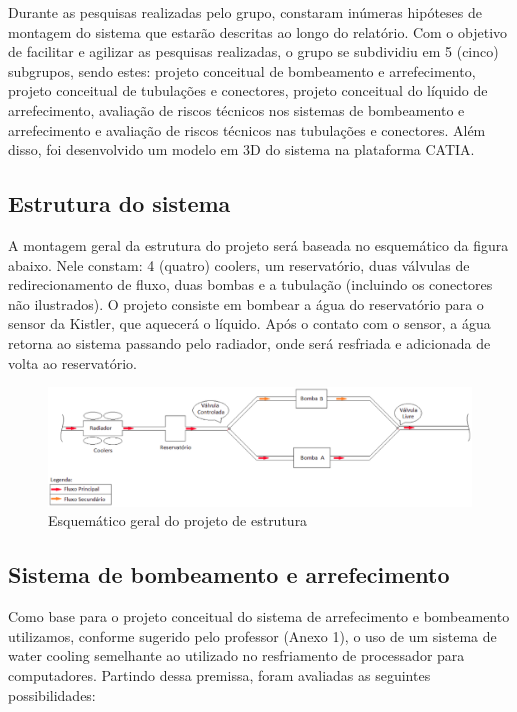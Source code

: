 Durante as pesquisas realizadas pelo grupo, constaram inúmeras hipóteses de montagem do sistema que estarão descritas ao longo do relatório. Com o objetivo de facilitar e agilizar as pesquisas realizadas, o grupo se subdividiu em 5 (cinco) subgrupos, sendo estes: projeto conceitual de bombeamento e arrefecimento, projeto conceitual de tubulações e conectores, projeto conceitual do líquido de arrefecimento, avaliação de riscos técnicos nos sistemas de bombeamento e arrefecimento e avaliação de riscos técnicos nas tubulações e conectores. Além disso, foi desenvolvido um modelo em 3D do sistema na plataforma CATIA.

\subsection{Estrutura do sistema}

A montagem geral da estrutura do projeto será baseada no esquemático da figura abaixo. Nele constam: 4 (quatro) coolers, um reservatório, duas válvulas de redirecionamento de fluxo, duas bombas e a tubulação (incluindo os conectores não ilustrados). O projeto consiste em bombear a água do reservatório para o sensor da Kistler, que aquecerá o líquido. Após o contato com o sensor, a água retorna ao sistema passando pelo radiador, onde será resfriada e adicionada de volta ao reservatório.

\begin{figure}[!htb]                                                               
   \centering                                                                      
   \includegraphics[width=15cm, keepaspectratio=true]{figuras/projetoestrutural.eps}
   \caption{Esquemático geral do projeto de estrutura}                        
\end{figure}


\subsection{Sistema de bombeamento e arrefecimento}

Como base para o projeto conceitual do sistema de arrefecimento e bombeamento utilizamos, conforme sugerido pelo professor (Anexo 1), o uso de um sistema de water cooling semelhante ao utilizado no resfriamento de processador para computadores. Partindo dessa premissa, foram avaliadas as seguintes possibilidades:

